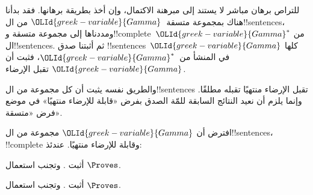 \documentclass[../../../include/open-logic-section]{subfiles}
\begin{document}
      {}
      {}


للتراص برهان مباشر لا يستند إلى مبرهنة الاكتمال، وإن أخذ بطريقة
برهانها. فقد بدأنا هناك بمجموعة متسقة~$\OLId{greek-variable}{Gamma}$ من ال!!{sentence}s،
ومددناها إلى مجموعة متسقة
و!!{complete}~$\OLId{greek-variable}{Gamma}^*$ من ال!!{sentence}s. ثم أثبتنا صدق
!!{sentence}s~$\OLId{greek-variable}{Gamma}$ كلها في
المنشأ من~$\OLId{greek-variable}{Gamma}^*$، فثبت أن $\OLId{greek-variable}{Gamma}$ تقبل الإرضاء.

والطريق نفسه يثبت أن كل مجموعة من ال!!{sentence}s تقبل الإرضاء
منتهيًا تقبله مطلقًا. وإنما يلزم أن نعيد النتائج السابقة للمّة الصدق
بفرض «قابلة للإرضاء منتهيًا» في موضع فرض «متسقة».

\begin{prop}
افترض أن $\OLId{greek-variable}{Gamma}$ مجموعة من ال!!{sentence}s، !!{complete} وقابلة للإرضاء
منتهيًا. عندئذ:
\begin{enumerate}


\end{enumerate}
\end{prop}

\begin{prob}
أثبت . وتجنب استعمال $\Proves$.
\end{prob}
\tagendprob

\begin{prob}
أثبت . وتجنب استعمال $\Proves$.
\end{prob}
\tagendprob

\end{document}
